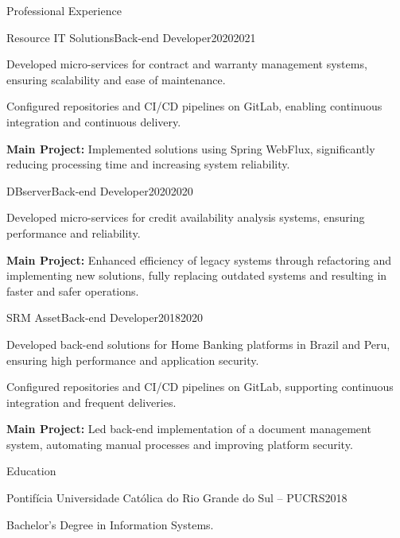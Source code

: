 \documentclass{domingosfelipe-resume}
\begin{document}
\begin{rSection}{Professional Experience}
    \begin{rExperienceSubsection}{Resource IT Solutions}{Back-end Developer}{2020}{2021}
        \item Developed micro-services for contract and warranty management systems, ensuring scalability and ease of maintenance.
        \item Configured repositories and CI/CD pipelines on GitLab, enabling continuous integration and continuous delivery.
        \item \textbf{Main Project:} Implemented solutions using Spring WebFlux, significantly reducing processing time and increasing system reliability.
    \end{rExperienceSubsection}

    \begin{rExperienceSubsection}{DBserver}{Back-end Developer}{2020}{2020}
        \item Developed micro-services for credit availability analysis systems, ensuring performance and reliability.
        \item \textbf{Main Project:} Enhanced efficiency of legacy systems through refactoring and implementing new solutions, fully replacing outdated systems and resulting in faster and safer operations.
    \end{rExperienceSubsection}

    \begin{rExperienceSubsection}{SRM Asset}{Back-end Developer}{2018}{2020}
        \item Developed back-end solutions for Home Banking platforms in Brazil and Peru, ensuring high performance and application security.
        \item Configured repositories and CI/CD pipelines on GitLab, supporting continuous integration and frequent deliveries.
        \item \textbf{Main Project:} Led back-end implementation of a document management system, automating manual processes and improving platform security.
    \end{rExperienceSubsection}
    \end{rSection}

    \begin{rSection}{Education}
        \begin{rEducationSubsection}{Pontifícia Universidade Católica do Rio Grande do Sul – PUCRS}{2018}    
            \item Bachelor's Degree in Information Systems.
        \end{rEducationSubsection}
    \end{rSection}
\end{document}
